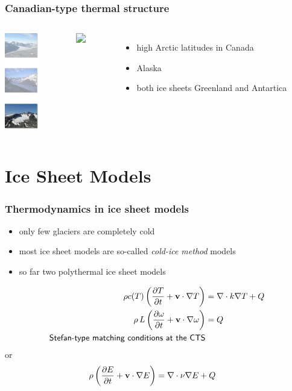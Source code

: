 \documentclass[hide notes,intlimits,unknownkeysallowed]{beamer}
\newcommand{\ddt}[1]{\ensuremath{\frac{\partial #1}{\partial t}}}
\begin{document}
\begin{frame}
 \frametitle{Canadian-type thermal structure}
  \begin{columns}
    \column[T]{1.75cm} 
    \vspace{1cm}
    {\includegraphics[width=1.5cm]{glaciersv_p}}%
    \vspace{2.5cm}
    \column[T]{10.25cm}
    \begin{figure}
      \includegraphics<1>[width=10cm]{CTSstructures-2land}
    \end{figure}
    \begin{itemize}
    \item high Arctic latitudes in Canada
    \item Alaska
    \item both ice sheets Greenland and Antartica
    \end{itemize}
  \end{columns}
\end{frame}



\section{Ice Sheet Models}


\begin{frame}
  \frametitle{Thermodynamics in ice sheet models}
  \begin{itemize}
  \item only few glaciers are completely cold
  \item most ice sheet models are so-called \emph{cold-ice method} models
  \item so far two polythermal ice sheet models
  \end{itemize}
      \begin{align*}
       \rho c(T)\left(\ddt{T} + {\bf v}\cdot\nabla T\right) & =  \nabla \cdot k \nabla T + Q \\
       \rho\,L\left(\ddt{\omega} + {\bf v}\cdot\nabla \omega \right) & =   Q \\
        \textsf{Stefan-type matching conditions at the CTS}
      \end{align*}
      or
     \begin{align*}
       \rho \left(\ddt{E} + {\bf v}\cdot\nabla E\right) & =  \nabla \cdot \nu \nabla E + Q
     \end{align*}
\end{frame}
\end{document}
